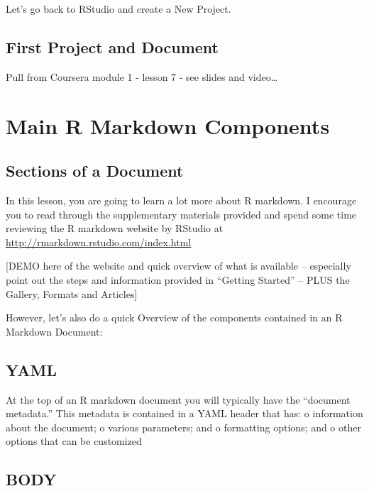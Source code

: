 \documentclass[
]{book}
\begin{document}
Let's go back to RStudio and create a New Project.

\hypertarget{first-project-and-document}{%
\section{First Project and Document}\label{first-project-and-document}}

Pull from Coursera module 1 - lesson 7 - see slides and video\ldots{}

\hypertarget{rmdcomponents}{%
\chapter{Main R Markdown Components}\label{rmdcomponents}}

\hypertarget{sections-of-a-document}{%
\section{Sections of a Document}\label{sections-of-a-document}}

In this lesson, you are going to learn a lot more about R markdown. I encourage you to read through the supplementary materials provided and spend some time reviewing the R markdown website by RStudio at \url{http://rmarkdown.rstudio.com/index.html}

{[}DEMO here of the website and quick overview of what is available -- especially point out the steps and information provided in ``Getting Started'' -- PLUS the Gallery, Formats and Articles{]}

However, let's also do a quick Overview of the components contained in an R Markdown Document:

\hypertarget{yaml}{%
\section{YAML}\label{yaml}}

At the top of an R markdown document you will typically have the ``document metadata.'' This metadata is contained in a YAML header that has:
o information about the document;
o various parameters; and
o formatting options; and
o other options that can be customized

\hypertarget{body}{%
\section{BODY}\label{body}}
\end{document}
